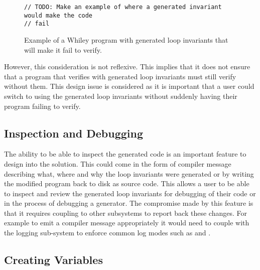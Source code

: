 \begin{figure}[ht]
\begin{lstlisting}
// TODO: Make an example of where a generated invariant would make the code
// fail
\end{lstlisting}
    \caption{Example of a Whiley program with generated loop invariants that will
    make it fail to verify.}
    \label{lst:backwards-compat}
\end{figure}

However, this consideration is not reflexive.
This implies that it does not ensure that a program that verifies with
generated loop invariants must still verify without them.
This design issue is considered as it is important that a user could
switch to using the generated loop invariants without suddenly having
their program failing to verify.


\subsection{Inspection and Debugging}

The ability to be able to inspect the generated code is an important feature to
design into the solution.
This could come in the form of compiler message describing what, where and why
the loop invariants were generated or by writing the modified program back
to disk as source code.
This allows a user to be able to inspect and review the generated loop invariants for
debugging of their code or in the process of debugging a generator.
The compromise made by this feature is that it requires coupling to other
subsystems to report back these changes.
For example to emit a compiler message appropriately it would need
to couple with the logging sub-system to enforce common log modes such as
 and .

\subsection{Creating Variables}\label{s:design-create-var}

